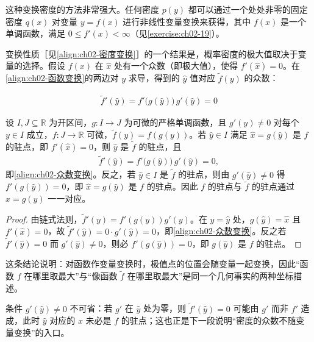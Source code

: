 \documentclass[../../main.tex]{subfiles}
\begin{document}
这种变换密度的方法非常强大。任何密度 $p(y)$ 都可以通过一个处处非零的固定密度 $q(x)$ 对变量 $y=f(x)$ 进行非线性变量变换来获得，其中 $f(x)$ 是一个单调函数，满足 $0\leqslant f'(x)<\infty$（见\cref{exercise:ch02-19}）。

变换性质［见\eqref{align:ch02-密度变换}］的一个结果是，概率密度的极大值取决于变量的选择。假设 $f(x)$ 在 $\hat{x}$ 处有一个众数（即极大值），使得 $f'(\hat{x})=0$。在\eqref{align:ch02-函数变换}的两边对 $y$ 求导，得到的 $\hat{y}$ 值对应 $\tilde{f}(y)$ 的众数：

\begin{align}
  \tilde{f}'(\hat{y}) = f'\big(g(\hat{y})\big)\,g'(\hat{y}) = 0
  \label{align:ch02-众数变换}
\end{align}

\begin{proposition}[像函数的众数]\label{proposition:ch02-众数变换}
设 $I,J\subseteq\mathbb{R}$ 为开区间，$g:I\to J$ 为可微的严格单调函数，且 $g'(y)\neq0$ 对每个 $y\in I$ 成立，$f:J\to\mathbb{R}$ 可微，$\tilde{f}(y)=f(g(y))$。若 $\hat{y}\in I$ 满足 $\hat{x}=g(\hat{y})$ 是 $f$ 的驻点，即 $f'(\hat{x})=0$，则 $\hat{y}$ 是 $\tilde{f}$ 的驻点，且
\begin{align*}
  \tilde{f}'(\hat{y})=f'\big(g(\hat{y})\big)\,g'(\hat{y})=0,
\end{align*}
即\eqref{align:ch02-众数变换}。反之，若 $\hat{y}\in I$ 是 $\tilde{f}$ 的驻点，则由 $g'(\hat{y})\neq0$ 得 $f'(g(\hat{y}))=0$，即 $\hat{x}=g(\hat{y})$ 是 $f$ 的驻点。因此 $f$ 的驻点与 $\tilde{f}$ 的驻点通过 $x=g(y)$ 一一对应。
\end{proposition}

\begin{proof}
由链式法则，$\tilde{f}'(y)=f'(g(y))g'(y)$。在 $y=\hat{y}$ 处，$g(\hat{y})=\hat{x}$ 且 $f'(\hat{x})=0$，故 $\tilde{f}'(\hat{y})=0\cdot g'(\hat{y})=0$，即\eqref{align:ch02-众数变换}。反之若 $\tilde{f}'(\hat{y})=0$ 而 $g'(\hat{y})\neq0$，则必 $f'(g(\hat{y}))=0$，即 $g(\hat{y})$ 是 $f$ 的驻点。
\end{proof}

\begin{remark}
这条结论说明：对函数作变量变换时，极值点的位置会随变量一起变换，因此“函数 $f$ 在哪里取最大”与“像函数 $\tilde f$ 在哪里取最大”是同一个几何事实的两种坐标描述。

条件 $g'(\hat{y})\neq0$ 不可省：若 $g'$ 在 $\hat y$ 处为零，则 $\tilde f'(\hat y)=0$ 可能由 $g'$ 而非 $f'$ 造成，此时 $\hat y$ 对应的 $x$ 未必是 $f$ 的驻点；这也正是下一段说明“密度的众数不随变量变换”的入口。
\end{remark}
\end{document}
